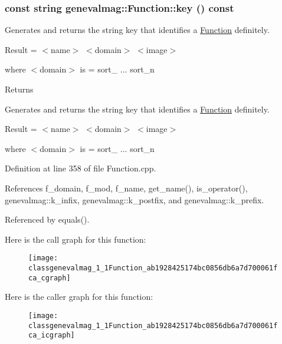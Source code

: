 \hypertarget{classgenevalmag_1_1Function_ab1928425174bc0856db6a7d700061fca}{
\subsubsection[{key}]{\setlength{\rightskip}{0pt plus 5cm}const string genevalmag::Function::key () const}}
\label{classgenevalmag_1_1Function_ab1928425174bc0856db6a7d700061fca}
Generates and returns the string key that identifies a \hyperlink{classgenevalmag_1_1Function}{Function} definitely.\par
 \par
 Result = $<$name$>$ $<$domain$>$ $<$image$>$\par
 \par
 where $<$domain$>$ is = sort\_ ... sort\_\-n\par
 \begin{DoxyReturn}{Returns}

\end{DoxyReturn}
Generates and returns the string key that identifies a \hyperlink{classgenevalmag_1_1Function}{Function} definitely.

Result = $<$name$>$ $<$domain$>$ $<$image$>$

where $<$domain$>$ is = sort\_ ... sort\_\-n 

Definition at line 358 of file Function.cpp.



References f\_\-domain, f\_\-mod, f\_\-name, get\_\-name(), is\_\-operator(), genevalmag::k\_\-infix, genevalmag::k\_\-postfix, and genevalmag::k\_\-prefix.



Referenced by equals().



Here is the call graph for this function:\nopagebreak
\begin{figure}[H]
\begin{center}
\leavevmode
\texttt{[image: classgenevalmag\_1\_1Function\_ab1928425174bc0856db6a7d700061fca\_cgraph]}
\end{center}
\end{figure}




Here is the caller graph for this function:\nopagebreak
\begin{figure}[H]
\begin{center}
\leavevmode
\texttt{[image: classgenevalmag\_1\_1Function\_ab1928425174bc0856db6a7d700061fca\_icgraph]}
\end{center}
\end{figure}


